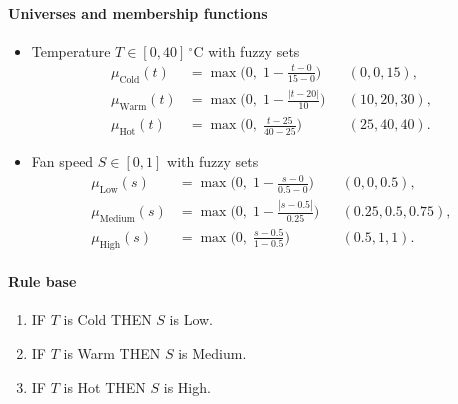 \paragraph{Universes and membership functions}
\begin{itemize}
\item Temperature $T \in [0,40]\,^\circ\mathrm{C}$ with fuzzy sets
    \begin{align*}
        \mu_{\text{Cold}}(t) &= \max\!\Big(0, \; 1 - \tfrac{t-0}{15-0}\Big) && (0,0,15),\\
        \mu_{\text{Warm}}(t) &= \max\!\Big(0, \; 1 - \tfrac{|t-20|}{10}\Big) && (10,20,30),\\
        \mu_{\text{Hot}}(t)  &= \max\!\Big(0, \; \tfrac{t-25}{40-25}\Big) && (25,40,40).
    \end{align*}
    \item Fan speed $S \in [0,1]$ with fuzzy sets
    \begin{align*}
        \mu_{\text{Low}}(s)    &= \max\!\Big(0, \; 1 - \tfrac{s-0}{0.5-0}\Big) && (0,0,0.5),\\
        \mu_{\text{Medium}}(s) &= \max\!\Big(0, \; 1 - \tfrac{|s-0.5|}{0.25}\Big) && (0.25,0.5,0.75),\\
        \mu_{\text{High}}(s)   &= \max\!\Big(0, \; \tfrac{s-0.5}{1-0.5}\Big) && (0.5,1,1).
    \end{align*}
\end{itemize}

\paragraph{Rule base}
\begin{enumerate}
    \item IF $T$ is Cold THEN $S$ is Low.
    \item IF $T$ is Warm THEN $S$ is Medium.
    \item IF $T$ is Hot THEN $S$ is High.
\end{enumerate}

